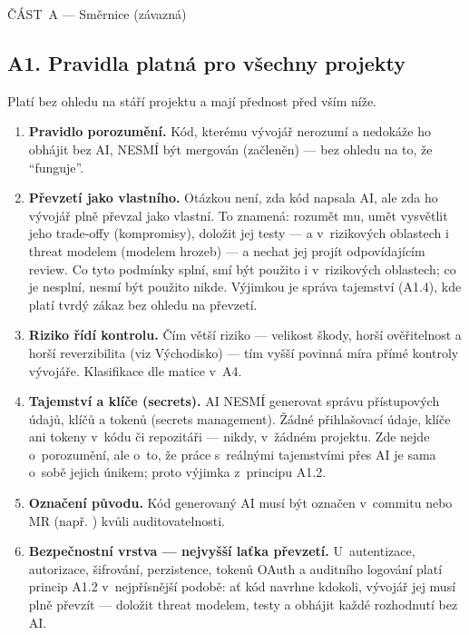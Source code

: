 \begin{partbanner}[navy]
\mbox{ČÁST A} --- Směrnice (závazná)
\end{partbanner}

\subsection{A1. Pravidla platná pro všechny projekty}

Platí bez ohledu na stáří projektu a mají přednost před vším níže.

\begin{enumerate}[label=\textbf{A1.\arabic*}]
\item \textbf{Pravidlo porozumění.}
Kód, kterému vývojář nerozumí a nedokáže ho obhájit bez AI, NESMÍ být mergován (začleněn) --- bez ohledu na to, že \enquote{funguje}.
\item \textbf{Převzetí jako vlastního.}
Otázkou není, zda kód napsala AI, ale zda ho vývojář plně převzal jako vlastní.
To znamená: rozumět mu, umět vysvětlit jeho trade-offy (kompromisy), doložit jej testy --- a v~rizikových oblastech i threat modelem (modelem hrozeb) --- a nechat jej projít odpovídajícím review.
Co tyto podmínky splní, smí být použito i v~rizikových oblastech; co je nesplní, nesmí být použito nikde.
Výjimkou je správa tajemství (A1.4), kde platí tvrdý zákaz bez ohledu na převzetí.
\item \textbf{Riziko řídí kontrolu.}
Čím větší riziko --- velikost škody, horší ověřitelnost a horší reverzibilita (viz Východisko) --- tím vyšší povinná míra přímé kontroly vývojáře.
Klasifikace dle matice v~A4.
\item \textbf{Tajemství a klíče (secrets).}
AI NESMÍ generovat správu přístupových údajů, klíčů a tokenů (secrets management).
Žádné přihlašovací údaje, klíče ani tokeny v~kódu či repozitáři --- nikdy, v~žádném projektu.
Zde nejde o~porozumění, ale o~to, že práce s~reálnými tajemstvími přes AI je sama o~sobě jejich únikem; proto výjimka z~principu A1.2.
\item \textbf{Označení původu.}
Kód generovaný AI musí být označen v~commitu nebo MR (např. \code{[ai-generated]}) kvůli auditovatelnosti.
\item \textbf{Bezpečnostní vrstva --- nejvyšší laťka převzetí.}
U~autentizace, autorizace, šifrování, perzistence, tokenů OAuth a auditního logování platí princip A1.2 v~nejpřísnější podobě: ať kód navrhne kdokoli, vývojář jej musí plně převzít --- doložit threat modelem, testy a obhájit každé rozhodnutí bez AI.

\end{enumerate}
